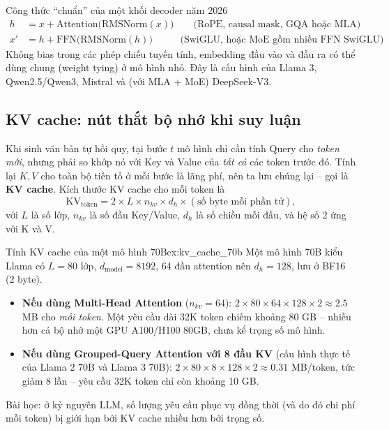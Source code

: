 \begin{deepdive}{Công thức “chuẩn” của một khối decoder năm 2026}
\begin{align*}
h &= x + \text{Attention}\big(\text{RMSNorm}(x)\big) \qquad \text{(RoPE, causal mask, GQA hoặc MLA)}\\
x' &= h + \text{FFN}\big(\text{RMSNorm}(h)\big) \qquad\;\;\; \text{(SwiGLU, hoặc MoE gồm nhiều FFN SwiGLU)}
\end{align*}
Không bias trong các phép chiếu tuyến tính, embedding đầu vào và đầu ra có thể dùng chung (weight tying) ở mô hình nhỏ. Đây là cấu hình của Llama 3, Qwen2.5/Qwen3, Mistral và (với MLA + MoE) DeepSeek-V3.
\end{deepdive}

\subsection{KV cache: nút thắt bộ nhớ khi suy luận}
\label{ssec:kv_cache}

Khi sinh văn bản tự hồi quy, tại bước $t$ mô hình chỉ cần tính Query cho \emph{token mới}, nhưng phải so khớp nó với Key và Value của \emph{tất cả} các token trước đó. Tính lại $K, V$ cho toàn bộ tiền tố ở mỗi bước là lãng phí, nên ta lưu chúng lại -- gọi là \textbf{KV cache}. Kích thước KV cache cho mỗi token là
\[
\text{KV}_{\text{token}} = 2 \times L \times n_{kv} \times d_h \times (\text{số byte mỗi phần tử}),
\]
với $L$ là số lớp, $n_{kv}$ là số đầu Key/Value, $d_h$ là số chiều mỗi đầu, và hệ số 2 ứng với K và V.

\begin{example}{Tính KV cache của một mô hình 70B}{ex:kv_cache_70b}
Một mô hình 70B kiểu Llama có $L = 80$ lớp, $d_{\text{model}} = 8192$, 64 đầu attention nên $d_h = 128$, lưu ở BF16 (2 byte).
\begin{itemize}
	\item \textbf{Nếu dùng Multi-Head Attention} ($n_{kv} = 64$): $2 \times 80 \times 64 \times 128 \times 2 \approx 2.5$ MB cho \emph{mỗi token}. Một yêu cầu dài 32K token chiếm khoảng 80 GB -- nhiều hơn cả bộ nhớ một GPU A100/H100 80GB, chưa kể trọng số mô hình.
	\item \textbf{Nếu dùng Grouped-Query Attention với 8 đầu KV} (cấu hình thực tế của Llama 2 70B và Llama 3 70B): $2 \times 80 \times 8 \times 128 \times 2 \approx 0.31$ MB/token, tức giảm 8 lần -- yêu cầu 32K token chỉ còn khoảng 10 GB.
\end{itemize}
Bài học: ở kỷ nguyên LLM, số lượng yêu cầu phục vụ đồng thời (và do đó chi phí mỗi token) bị giới hạn bởi KV cache nhiều hơn bởi trọng số.
\end{example}

